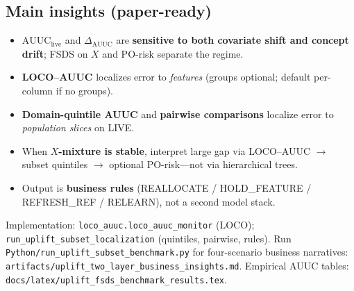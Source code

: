 \subsection{Main insights (paper-ready)}

\begin{itemize}
  \item $\mathrm{AUUC}_{\mathrm{live}}$ and $\Delta_{\mathrm{AUUC}}$ are \textbf{sensitive to both covariate shift and concept drift}; FSDS on $X$ and PO-risk separate the regime.
  \item \textbf{LOCO--AUUC} localizes error to \emph{features} (groups optional; default per-column if no groups).
  \item \textbf{Domain-quintile AUUC} and \textbf{pairwise comparisons} localize error to \emph{population slices} on LIVE.
  \item When \textbf{$X$-mixture is stable}, interpret large gap via LOCO--AUUC $\rightarrow$ subset quintiles $\rightarrow$ optional PO-risk---not via hierarchical trees.
  \item Output is \textbf{business rules} (REALLOCATE / HOLD\_FEATURE / REFRESH\_REF / RELEARN), not a second model stack.
\end{itemize}

\noindent Implementation: \texttt{loco\_auuc.loco\_auuc\_monitor} (LOCO); \texttt{run\_uplift\_subset\_localization} (quintiles, pairwise, rules).
Run \verb|Python/run_uplift_subset_benchmark.py| for four-scenario business narratives:
\verb|artifacts/uplift_two_layer_business_insights.md|.
Empirical AUUC tables: \verb|docs/latex/uplift_fsds_benchmark_results.tex|.
